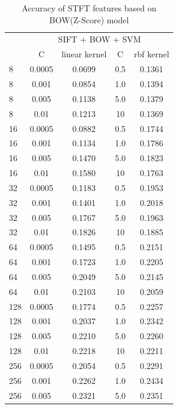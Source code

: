\documentclass[conference]{IEEEtran}
\begin{document}
\begin{table}[htbp]
	\centering
	\newcommand{\tabincell}[2]{\begin{tabular}{@{}#1@{}}#2\end{tabular}}
	\renewcommand\arraystretch{1.0}
	\caption{Accuracy of STFT features based on BOW(Z-Score) model}
	\label{base1}%
	\begin{tabular}{@{}p{1cm}<{\centering}|c|c|c|c}
		\hline
		\multirow{2}{*}{\diagbox[height=2\line,width=1.42cm,font=\tiny]{$k$}{Acc.}{$\mathit{M}$}} &
		\multicolumn{4}{c}{SIFT + BOW + SVM}\\
		\cline{2-5}
		& {C} & {linear kernel} & {C} & {rbf kernel}\\
		\hline
		8   & 0.0005 & 0.0699 & 0.5 & 0.1361\\
		8   & 0.001 & 0.0854 & 1.0 & 0.1394\\
		8   & 0.005 & 0.1138 & 5.0 & 0.1379\\
		8   & 0.01  & 0.1213 & 10 & 0.1369\\
		16   & 0.0005  & 0.0882 & 0.5 & 0.1744\\
		16   & 0.001  & 0.1134 & 1.0 & 0.1786\\
		16   & 0.005  & 0.1470 & 5.0 & 0.1823\\
		16   & 0.01  & 0.1580 & 10 & 0.1763\\
		32   & 0.0005  & 0.1183 & 0.5 & 0.1953\\
		32   & 0.001  & 0.1401 & 1.0 & 0.2018\\
		32   & 0.005  & 0.1767 & 5.0 & 0.1963\\
		32   & 0.01  & 0.1826 & 10 & 0.1885\\
		64   & 0.0005  & 0.1495 & 0.5 & 0.2151\\
		64   & 0.001  & 0.1723 & 1.0 & 0.2205\\
		64   & 0.005  & 0.2049 & 5.0 & 0.2145\\
		64   & 0.01  & 0.2103 & 10 & 0.2059\\
		128   & 0.0005  & 0.1774 & 0.5 & 0.2257\\
		128   & 0.001  & 0.2037 & 1.0 & 0.2342\\
		128   & 0.005  & 0.2210 & 5.0 & 0.2260\\
		128   & 0.01  & 0.2218 & 10 & 0.2211\\
		256   & 0.0005  & 0.2054 & 0.5 & 0.2291\\
		256   & 0.001  & 0.2262 & 1.0 & 0.2434\\
		256   & 0.005  & 0.2321 & 5.0 & 0.2351\\

\end{tabular}
\end{table}
\end{document}
